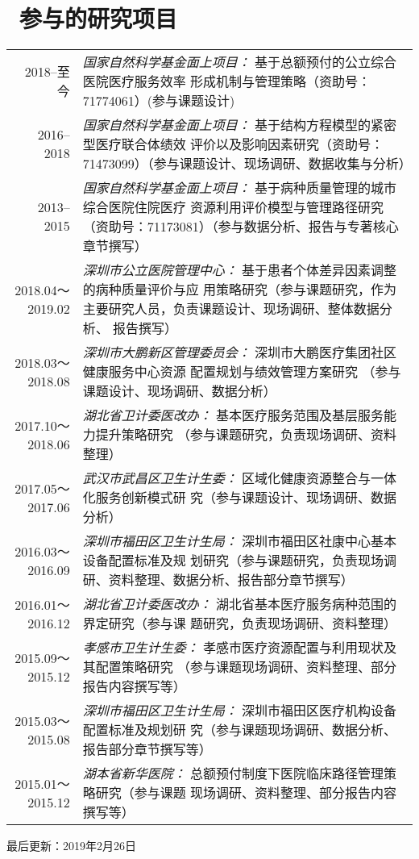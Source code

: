 \documentclass{resume}
\begin{document}
\section{\faPuzzlePiece\ 参与的研究项目}
\begin{longtable}{r p{13.3cm}}
2018--至今 & \textit{国家自然科学基金面上项目：} 基于总额预付的公立综合医院医疗服务效率 形成机制与管理策略（资助号：71774061）(参与课题设计)\\
2016--2018 & \textit{国家自然科学基金面上项目：} 基于结构方程模型的紧密型医疗联合体绩效 评价以及影响因素研究（资助号：71473099）（参与课题设计、现场调研、数据收集与分析）\\
2013--2015 & \textit{国家自然科学基金面上项目：} 基于病种质量管理的城市综合医院住院医疗 资源利用评价模型与管理路径研究（资助号：71173081）（参与数据分析、报告与专著核心章节撰写）\\
2018.04～2019.02 & \textit{深圳市公立医院管理中心：} 基于患者个体差异因素调整的病种质量评价与应 用策略研究（参与课题研究，作为主要研究人员，负责课题设计、现场调研、整体数据分析、 报告撰写）\\
2018.03～2018.08 & \textit{深圳市大鹏新区管理委员会：} 深圳市大鹏医疗集团社区健康服务中心资源 配置规划与绩效管理方案研究 （参与课题设计、现场调研、数据分析）\\
2017.10～2018.06 & \textit{湖北省卫计委医改办：} 基本医疗服务范围及基层服务能力提升策略研究 （参与课题研究，负责现场调研、资料整理）\\
2017.05～2017.06 & \textit{武汉市武昌区卫生计生委：} 区域化健康资源整合与一体化服务创新模式研 究（参与课题设计、现场调研、数据分析）\\
2016.03～2016.09 & \textit{深圳市福田区卫生计生局：} 深圳市福田区社康中心基本设备配置标准及规 划研究（参与课题研究，负责现场调研、资料整理、数据分析、报告部分章节撰写）\\
2016.01～2016.12 & \textit{湖北省卫计委医改办：} 湖北省基本医疗服务病种范围的界定研究（参与课 题研究，负责现场调研、资料整理）\\
2015.09～2015.12 & \textit{孝感市卫生计生委：} 孝感市医疗资源配置与利用现状及其配置策略研究 （参与课题现场调研、资料整理、部分报告内容撰写等）\\
2015.03～2015.08 & \textit{深圳市福田区卫生计生局：} 深圳市福田区医疗机构设备配置标准及规划研 究（参与课题现场调研、数据分析、报告部分章节撰写等）\\
2015.01～2015.12 & \textit{湖本省新华医院：} 总额预付制度下医院临床路径管理策略研究（参与课题 现场调研、资料整理、部分报告内容撰写等）\\
\end{longtable}


\vfill{}
\begin{center}
{\scriptsize  最后更新：2019年2月26日 }
\end{center}
\end{document}
